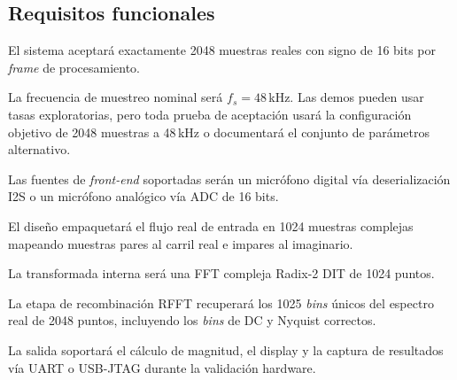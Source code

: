 \documentclass[11pt,a4paper]{article}
\begin{document}
\subsection{Requisitos funcionales}
\begin{description}[leftmargin=4.2em,style=nextline]
  \item[FUN-1:] El sistema aceptará exactamente 2048 muestras reales con signo de
    16 bits por \emph{frame} de procesamiento.
  \item[FUN-2:] La frecuencia de muestreo nominal será $f_s = 48$\,kHz. Las demos
    pueden usar tasas exploratorias, pero toda prueba de aceptación usará la
    configuración objetivo de 2048 muestras a 48\,kHz o documentará el conjunto
    de parámetros alternativo.
  \item[FUN-3:] Las fuentes de \emph{front-end} soportadas serán un micrófono
    digital vía deserialización I2S o un micrófono analógico vía ADC de 16 bits.
  \item[FUN-4:] El diseño empaquetará el flujo real de entrada en 1024 muestras
    complejas mapeando muestras pares al carril real e impares al imaginario.
  \item[FUN-5:] La transformada interna será una FFT compleja Radix-2 DIT de 1024
    puntos.
  \item[FUN-6:] La etapa de recombinación RFFT recuperará los 1025 \emph{bins}
    únicos del espectro real de 2048 puntos, incluyendo los \emph{bins} de DC y
    Nyquist correctos.
  \item[FUN-7:] La salida soportará el cálculo de magnitud, el display y la
    captura de resultados vía UART o USB-JTAG durante la validación hardware.
\end{description}
\end{document}
